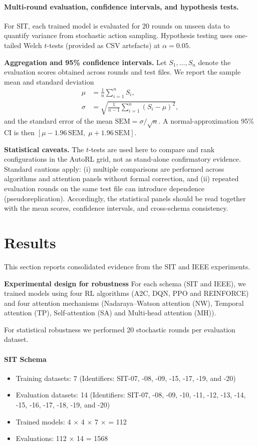 \documentclass[sn-basic]{sn-jnl} %
\begin{document}
\paragraph{Multi-round evaluation, confidence intervals, and hypothesis tests.}
For SIT, each trained model is evaluated for 20 rounds on unseen data to quantify variance from stochastic action sampling. Hypothesis testing uses one-tailed Welch $t$-tests (provided as CSV artefacts) at $\alpha=0.05$.

\textbf{Aggregation and 95\% confidence intervals.}
Let $S_1,\ldots,S_n$ denote the evaluation scores obtained across rounds and test files. We report the sample mean and standard deviation
\begin{align}
\mu &= \frac{1}{n}\sum_{i=1}^{n} S_i,\\
\sigma &= \sqrt{\frac{1}{n-1}\sum_{i=1}^{n}(S_i-\mu)^2},
\end{align}
and the standard error of the mean $\mathrm{SEM}=\sigma/\sqrt{n}$. A normal-approximation 95\% CI is then $[\mu-1.96\,\mathrm{SEM},\;\mu+1.96\,\mathrm{SEM}]$.

\textbf{Statistical caveats.}
The $t$-tests are used here to compare and rank configurations in the AutoRL grid, not as stand-alone confirmatory evidence. Standard cautions apply: (i) multiple comparisons are performed across algorithms and attention panels without formal correction, and (ii) repeated evaluation rounds on the same test file can introduce dependence (pseudoreplication). Accordingly, the statistical panels should be read together with the mean scores, confidence intervals, and cross-schema consistency.

\section{Results} \label{sec:results}
This section reports consolidated evidence from the SIT and IEEE experiments.

\textbf{Experimental design for robustness}
For each schema (SIT and IEEE), we trained models using four RL algorithms (A2C, DQN, PPO and REINFORCE) and four attention mechanisms (Nadaraya--Watson attention (NW), Temporal attention (TP), Self-attention (SA) and Multi-head attention (MH)).

For statistical robustness we performed 20 stochastic rounds per evaluation dataset.

\paragraph{SIT Schema}
\begin{itemize}
	\item Training datasets: 7 (Identifiers: SIT-07, -08, -09, -15, -17, -19, and -20)
	\item Evaluation datasets: 14 (Identifiers: SIT-07, -08, -09, -10, -11, -12, -13, -14, -15, -16, -17, -18, -19, and -20)
	\item Trained models: 4 $\times$ 4 $\times$ 7 $\times$ = 112
	\item Evaluations: 112 $\times$ 14 = 1568
\end{itemize}
\end{document}
